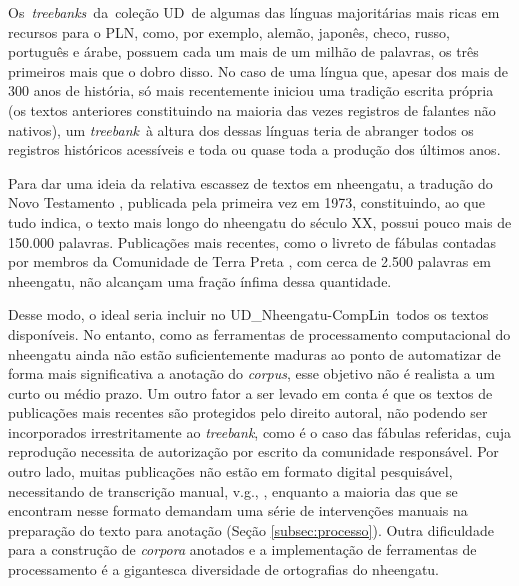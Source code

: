 \documentclass[portuguese]{textolivre}
\newcommand{\udc}{coleção UD}
\newcommand{\tbc}{UD\_Nheengatu-CompLin}
\newcommand{\tbs}{\textit{treebanks}}
\newcommand{\tb}{\textit{treebank}}
\begin{document}
Os~\tbs~da~\udc~de algumas das línguas majoritárias mais ricas em recursos para o PLN, como, por exemplo, alemão, japonês, checo, russo, português e árabe, possuem cada um mais de um milhão de palavras, os três primeiros mais que o dobro disso. No caso de uma língua que, apesar dos mais de 300 anos de história, só mais recentemente iniciou uma tradição escrita própria (os textos anteriores constituindo na maioria das vezes registros de falantes não nativos), um \tb~à altura dos dessas línguas teria de abranger todos os registros históricos acessíveis e toda ou quase toda a produção dos últimos anos.

Para dar uma ideia da relativa escassez de textos em nheengatu, a tradução do Novo Testamento \parencite{novo-testamento-nyengatu}, publicada pela primeira vez em 1973, constituindo, ao que tudo indica, o texto mais longo do nheengatu do século XX, possui pouco mais de 150.000 palavras. Publicações mais recentes, como o livreto de fábulas contadas por membros da Comunidade de Terra Preta \parencite{fabulas2013}, com cerca de 2.500 palavras em nheengatu, não alcançam uma fração ínfima dessa quantidade.

Desse modo, o ideal seria incluir no \tbc~todos os textos disponíveis. No entanto, como as ferramentas de processamento computacional do nheengatu ainda não estão suficientemente maduras ao ponto de automatizar de forma mais significativa a anotação do \textit{corpus}, esse objetivo não é realista a um curto ou médio prazo. Um outro fator a ser levado em conta é que os textos de publicações mais recentes são protegidos pelo direito autoral, não podendo ser incorporados irrestritamente ao \tb, como é o caso das fábulas referidas, cuja reprodução necessita de autorização por escrito da comunidade responsável. Por outro lado, muitas publicações não estão em formato digital pesquisável, necessitando de transcrição manual, v.g., \textcite{costa1909}, enquanto a maioria das que se encontram nesse formato demandam uma série de intervenções manuais na preparação do texto para anotação (Seção \ref{subsec:processo}). Outra dificuldade para a construção de \textit{corpora} anotados e a implementação de ferramentas de processamento é a gigantesca diversidade de ortografias do nheengatu.
\end{document}
